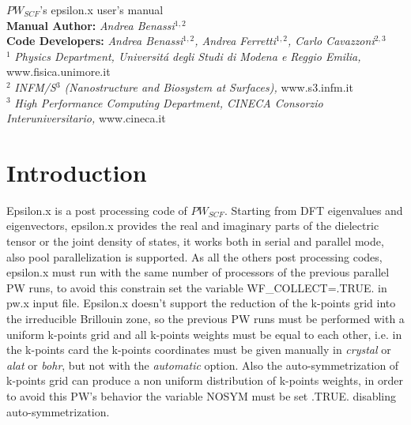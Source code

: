 \documentclass[twocolumn]{article}
\begin{document}
\begin{titlepage}
\Huge
\begin{center}
$PW_{SCF}$'s epsilon.x user's manual\\[4.5cm]
\normalsize
\vspace{10.5cm}
\textbf{Manual Author:}
\emph{Andrea Benassi}$^{1,2}$\\[0.3cm]
\textbf{Code Developers:}
\emph{Andrea Benassi$^{1,2}$, Andrea Ferretti$^{1,2}$, Carlo Cavazzoni$^{2,3}$}\\[1cm]
$^{1}$ \emph{Physics Department, Universit\'a degli Studi di Modena e Reggio Emilia,} www.fisica.unimore.it\\
$^{2}$ \emph{INFM/S$^{3}$ (Nanostructure and Biosystem at Surfaces),} www.s3.infm.it\\
$^{3}$ \emph{High Performance Computing Department, CINECA Consorzio Interuniversitario,} www.cineca.it\\
\end{center}
\end{titlepage}
\newpage
\section{Introduction}
Epsilon.x is a post processing code of $PW_{SCF}$. Starting from DFT eigenvalues and eigenvectors,
epsilon.x provides the real and imaginary parts of the dielectric tensor or the joint density of states, it works both in serial and
parallel mode, also pool parallelization is supported. As all the others post processing codes, epsilon.x must run with the same number of
processors of the previous parallel PW runs, to avoid this constrain set the variable WF\_COLLECT=.TRUE.
in pw.x input file.   
Epsilon.x doesn't support the reduction of the k-points grid into the irreducible Brillouin zone, so the previous PW runs must be
performed with a uniform k-points grid and all k-points weights must be equal to each other, i.e. in the k-points card the k-points
coordinates must be given manually in \emph{crystal} or \emph{alat} or \emph{bohr}, but not with the \emph{automatic} option. Also the
auto-symmetrization of k-points grid can produce a non uniform distribution of k-points weights, in order to avoid this
PW's behavior the variable NOSYM must be set .TRUE. disabling auto-symmetrization.
\end{document}
